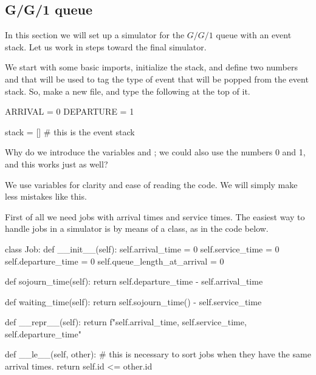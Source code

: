 \subsection{G/G/1 queue}
\label{sec:gg1-queue}

In this section we will set up a simulator for the $G/G/1$ queue with  an event stack. Let us work in steps toward the final simulator.

We start with some basic imports, initialize the stack, and define two numbers  and  that will be used to tag the type of event that will be popped from the event stack.
So, make a new file, and type the following at the top of it.

\begin{pyverbatim}
ARRIVAL = 0
DEPARTURE = 1

stack = []  # this is the event stack
\end{pyverbatim}

\begin{exercise}
  Why do we introduce the variables  and ; we could also use the numbers 0 and 1, and this works just as well?
  \begin{solution}
    We use variables for clarity and ease of reading the code. We will simply make less mistakes like this. 
  \end{solution}
\end{exercise}


First of all we need jobs with arrival times and service times. The easiest way to handle jobs in a simulator is by means of a class, as in the code below.


\begin{pyverbatim}
class Job:
    def __init__(self):
        self.arrival_time = 0
        self.service_time = 0
        self.departure_time = 0
        self.queue_length_at_arrival = 0

    def sojourn_time(self):
        return self.departure_time - self.arrival_time

    def waiting_time(self):
        return self.sojourn_time() - self.service_time

    def __repr__(self):
        return f"{self.arrival_time}, {self.service_time}, {self.departure_time}\n"

    def __le__(self, other):
        # this is necessary to sort jobs when they have the same arrival times.
        return self.id <= other.id
\end{pyverbatim}

